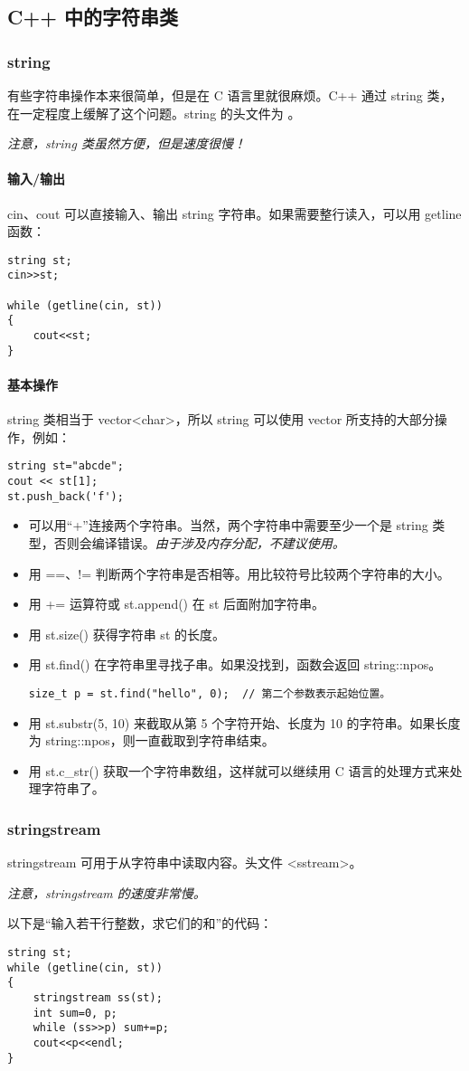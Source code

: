 \subsection{C++ 中的字符串类}
\subsubsection{string}
	有些字符串操作本来很简单，但是在 C 语言里就很麻烦。C++ 通过 string 类，在一定程度上缓解了这个问题。string 的头文件为 。

	\emph{注意，string 类虽然方便，但是速度很慢！}
	
	\paragraph{输入/输出}
		cin、cout 可以直接输入、输出 string 字符串。如果需要整行读入，可以用 getline 函数：

		\begin{lstlisting}
string st;
cin>>st;

while (getline(cin, st))
{
	cout<<st;
}
		\end{lstlisting}
		
	\paragraph{基本操作}
		string 类相当于 vector<char>，所以 string 可以使用 vector 所支持的大部分操作，例如：

		\begin{lstlisting}
string st="abcde";
cout << st[1];
st.push_back('f');
		\end{lstlisting}
		
		\begin{itemize}
			\item 可以用``+''连接两个字符串。当然，两个字符串中需要至少一个是 string 类型，否则会编译错误。\emph{由于涉及内存分配，不建议使用。}
			\item 用 ==、!= 判断两个字符串是否相等。用比较符号比较两个字符串的大小。
			\item 用 += 运算符或 st.append() 在 st 后面附加字符串。
			\item 用 st.size() 获得字符串 st 的长度。
			\item 用 st.find() 在字符串里寻找子串。如果没找到，函数会返回 string::npos。
			\begin{lstlisting}
size_t p = st.find("hello", 0);  // 第二个参数表示起始位置。
			\end{lstlisting}
			\item 用 st.substr(5, 10) 来截取从第 5 个字符开始、长度为 10 的字符串。如果长度为 string::npos，则一直截取到字符串结束。
			\item 用 st.c\_{}str() 获取一个字符串数组，这样就可以继续用 C 语言的处理方式来处理字符串了。
		\end{itemize}

\subsubsection{stringstream}
	stringstream 可用于从字符串中读取内容。头文件 <sstream>。
	
	\emph{注意，stringstream 的速度非常慢。}
	
	以下是“输入若干行整数，求它们的和”的代码：
	
	\begin{lstlisting}
string st;
while (getline(cin, st))
{
	stringstream ss(st);
	int sum=0, p;
	while (ss>>p) sum+=p;
	cout<<p<<endl;
}
	\end{lstlisting}